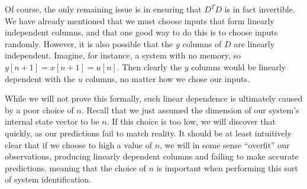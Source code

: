 \documentclass[letterpaper]{article}
\theoremstyle{remark}
\begin{document}
Of course, the only remaining issue is in ensuring that $D^TD$ is in fact invertible. We have already mentioned that we must choose inputs that form linearly independent columns, and that one good way to do this is to choose inputs randomly. However, it is also possible that the $y$ columns of $D$ are linearly independent. Imagine, for instance, a system with no memory, so $y[n+1] = x[n+1] = u[n]$. Then clearly the $y$ columns would be linearly dependent with the $u$ columns, no matter how we chose our inputs.

While we will not prove this formally, such linear dependence is ultimately caused by a poor choice of $n$. Recall that we just assumed the dimension of our system's internal state vector to be $n$. If this choice is too low, we will discover that quickly, as our predictions fail to match reality. It should be at least intuitively clear that if we choose to high a value of $n$, we will in some sense ``overfit'' our observations, producing linearly dependent columns and failing to make accurate predictions, meaning that the choice of $n$ is important when performing this sort of system identification.
\end{document}
